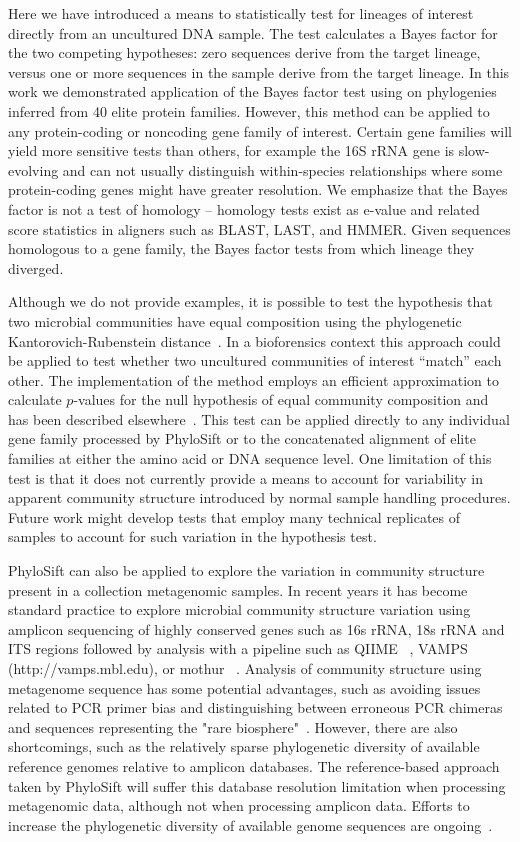\documentclass[10pt]{article}
\begin{document}
Here we have introduced a means to statistically test for lineages of interest directly from an uncultured DNA sample.
The test calculates a Bayes factor for the two competing hypotheses: zero sequences derive from the target lineage, versus one or more sequences in the sample derive from the target lineage.
In this work we demonstrated application of the Bayes factor test using on phylogenies inferred from 40 elite protein families.
However, this method can be applied to any protein-coding or noncoding gene family of interest.
Certain gene families will yield more sensitive tests than others, for example the 16S rRNA gene is slow-evolving and can not usually distinguish within-species relationships where some protein-coding genes might have greater resolution.
We emphasize that the Bayes factor is not a test of homology -- homology tests exist as e-value and related score statistics in aligners such as BLAST, LAST, and HMMER.
Given sequences homologous to a gene family, the Bayes factor tests from which lineage they diverged.

Although we do not provide examples, it is possible to test the hypothesis that two microbial communities have equal composition using the phylogenetic Kantorovich-Rubenstein distance~\cite{Evans2010}.
In a bioforensics context this approach could be applied to test whether two uncultured communities of interest ``match'' each other.
The implementation of the method employs an efficient approximation to calculate $p$-values for the null hypothesis of equal community composition and has been described elsewhere~\cite{Evans2010}.
This test can be applied directly to any individual gene family processed by PhyloSift or to the concatenated alignment of elite families at either the amino acid or DNA sequence level.
One limitation of this test is that it does not currently provide a means to account for variability in apparent community structure introduced by normal sample handling procedures.
Future work might develop tests that employ many technical replicates of samples to account for such variation in the hypothesis test.

PhyloSift can also be applied to explore the variation in community structure present in a collection metagenomic samples.
In recent years it has become standard practice to explore microbial community structure variation using amplicon sequencing of highly conserved genes such as 16s rRNA, 18s rRNA and ITS regions followed by analysis with a pipeline such as QIIME ~\cite{Caporaso2010}, VAMPS (http://vamps.mbl.edu), or mothur ~\cite{schloss2009}.
Analysis of community structure using metagenome sequence has some potential advantages, such as avoiding issues related to PCR primer bias and distinguishing between erroneous PCR chimeras and sequences representing the "rare biosphere"~\cite{Bik2012}.
However, there are also shortcomings, such as the relatively sparse phylogenetic diversity of available reference genomes relative to amplicon databases.
The reference-based approach taken by PhyloSift will suffer this database resolution limitation when processing metagenomic data, although not when processing amplicon data.
Efforts to increase the phylogenetic diversity of available genome sequences are ongoing~\cite{Wu2009}.
\end{document}
